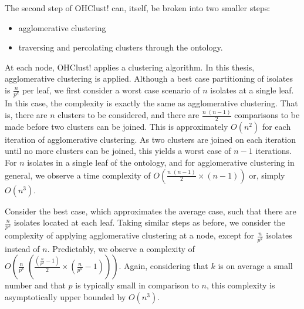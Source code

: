 \documentclass[12pt]{ucthesis}
\begin{document}
      The second step of \textsf{OHClust!} can, itself, be broken into two
      smaller steps:
      \begin{itemize}
         \item \textsf{agglomerative clustering}
         \item traversing and percolating clusters through the ontology.
      \end{itemize}
      At each node, \textsf{OHClust!} applies a clustering algorithm. In this
      thesis, \textsf{agglomerative clustering} is applied. Although a best
      case partitioning of isolates is $\frac{n}{p^{k}}$ per leaf, we first
      consider a worst case scenario of $n$ isolates at a single leaf. In this
      case, the complexity is exactly the same as agglomerative clustering.
      That is, there are $n$ clusters to be considered, and there are
      $\frac{n\;(n-1)}{2}$ comparisons to be made before two clusters can
      be joined. This is approximately $O(n^2)$ for each iteration of
      \textsf{agglomerative clustering}. As two clusters are joined on each
      iteration until no more clusters can be joined, this yields a worst case
      of $n-1$ iterations. For $n$ isolates in a single leaf of the ontology,
      and for \textsf{agglomerative clustering} in general, we observe a time
      complexity of $O(\frac{n\;(n - 1)}{2} \times (n - 1))$ or, simply
      $O(n^{3})$.

      Consider the best case, which approximates the average case, such that
      there are $\frac{n}{p^{k}}$ isolates located at each leaf. Taking
      similar steps as before, we consider the complexity of applying
      \textsf{agglomerative clustering} at a node, except for $\frac{n}{p^{k}}$
      isolates instead of $n$. Predictably, we observe a complexity of
      $O(\frac{n}{p^{k}}\;(\frac{(\frac{n}{p^{k}} - 1)}{2} \times
      (\frac{n}{p^{k}} - 1)))$. Again, considering that $k$ is on average a
      small number and that $p$ is typically small in comparison to $n$, this
      complexity is asymptotically upper bounded by $O(n^{3})$.
\end{document}
